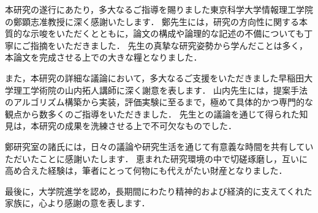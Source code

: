 \documentclass[a4paper,11pt,oneside,openany,report,dvipdfmx]{jsbook}
\begin{document}
本研究の遂行にあたり，多大なるご指導を賜りました東京科学大学情報理工学院の鄭顕志准教授に深く感謝いたします．
鄭先生には，研究の方向性に関する本質的な示唆をいただくとともに，論文の構成や論理的な記述の不備についても丁寧にご指摘をいただきました．
先生の真摯な研究姿勢から学んだことは多く，本論文を完成させる上での大きな糧となりました．

また，本研究の詳細な議論において，多大なるご支援をいただきました早稲田大学理工学術院の山内拓人講師に深く謝意を表します．
山内先生には，提案手法のアルゴリズム構築から実装，評価実験に至るまで，極めて具体的かつ専門的な観点から数多くのご指導をいただきました．
先生との議論を通じて得られた知見は，本研究の成果を洗練させる上で不可欠なものでした．

鄭研究室の諸氏には，日々の議論や研究生活を通じて有意義な時間を共有していただいたことに感謝いたします．
恵まれた研究環境の中で切磋琢磨し，互いに高め合えた経験は，筆者にとって何物にも代えがたい財産となりました．

最後に，大学院進学を認め，長期間にわたり精神的および経済的に支えてくれた家族に，心より感謝の意を表します．



\end{document}
